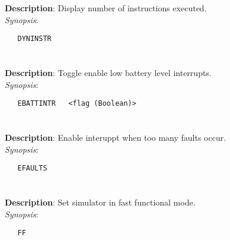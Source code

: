 \section{\quad{}}
\label{manpages:DYNINSTR}
\label{manpages:dyninstr}
\vspace{-0.1in}
{\bf Description}: 	Display number of instructions executed.\\[1.5ex]
{\em Synopsis}:
\vspace{-0.05in}
\scriptsize
\begin{lstlisting}
   DYNINSTR   									
\end{lstlisting}
\normalsize
\vspace{-0.05in}


\section{\quad{}}
\label{manpages:EBATTINTR}
\label{manpages:ebattintr}
\vspace{-0.1in}
{\bf Description}: 	Toggle enable low battery level interrupts.\\[1.5ex]
{\em Synopsis}:
\vspace{-0.05in}
\scriptsize
\begin{lstlisting}
   EBATTINTR   <flag (Boolean)>							
\end{lstlisting}
\normalsize
\vspace{-0.05in}


\section{\quad{}}
\label{manpages:EFAULTS}
\label{manpages:efaults}
\vspace{-0.1in}
{\bf Description}: 	Enable interuppt when too many faults occur.\\[1.5ex]
{\em Synopsis}:
\vspace{-0.05in}
\scriptsize
\begin{lstlisting}
   EFAULTS   								
\end{lstlisting}
\normalsize
\vspace{-0.05in}


\section{\quad{}}
\label{manpages:FF}
\label{manpages:ff}
\vspace{-0.1in}
{\bf Description}: 	Set simulator in fast functional mode.\\[1.5ex]
{\em Synopsis}:
\vspace{-0.05in}
\scriptsize
\begin{lstlisting}
   FF   									
\end{lstlisting}
\normalsize
\vspace{-0.05in}


